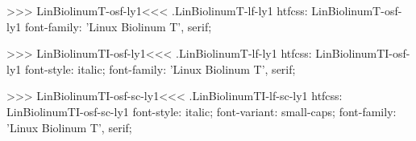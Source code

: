 >>>
\<LinBiolinumT-osf-ly1\><<<
.LinBiolinumT-lf-ly1
htfcss:  LinBiolinumT-osf-ly1  font-family: 'Linux Biolinum T', serif;

>>>
\<LinBiolinumTI-osf-ly1\><<<
.LinBiolinumT-lf-ly1
htfcss:  LinBiolinumTI-osf-ly1  font-style: italic; font-family: 'Linux Biolinum T', serif;

>>>
\<LinBiolinumTI-osf-sc-ly1\><<<
.LinBiolinumTI-lf-sc-ly1
htfcss:  LinBiolinumTI-osf-sc-ly1  font-style: italic; font-variant: small-caps; font-family: 'Linux Biolinum T', serif;

